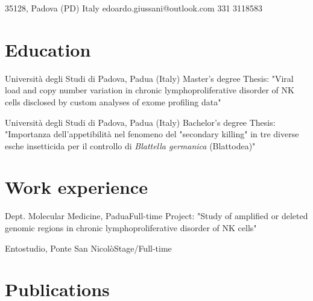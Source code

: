 \documentclass{curriculum}
\author{Edoardo Giussani}
\begin{document}

        {35128, Padova (PD)} 
        {Italy}
        {edoardo.giussani@outlook.com}
        {331 3118583}

    \section{Education}
        {Università degli Studi di Padova, Padua (Italy)} {Master's degree}
        Thesis: "Viral load and copy number variation in chronic 
          lymphoproliferative disorder of NK cells disclosed by custom analyses
          of exome profiling data"

        {Università degli Studi di Padova, Padua (Italy)} {Bachelor's degree}
        Thesis: "Importanza dell'appetibilità nel fenomeno del "secondary 
        killing" in tre diverse esche insetticida per il controllo
        di \textit{Blattella germanica} (Blattodea)"



    \section{Work experience}
    {Dept. Molecular Medicine, Padua}{Full-time}
        Project: "Study of amplified or deleted genomic regions in chronic 
        lymphoproliferative disorder of NK cells"

    {Entostudio, Ponte San Nicolò}{Stage/Full-time}

    \section{Publications}
            \nocite{*}
            \printbibliography[heading=none,filter=mine]{}
\end{document}
